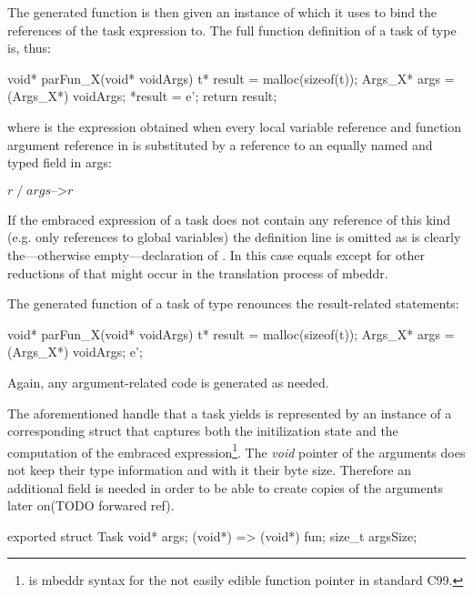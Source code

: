 The generated function  is then given an instance of  which it uses to bind the references of the task expression to. The full function definition of a task  of type  is, thus:

\begin{ccode}
void* parFun_X(void* voidArgs) {
  t* result = malloc(sizeof(t));
  Args_X* args = (Args_X*) voidArgs;
  *result = e';
  return result;
}
\end{ccode}

where  is the expression obtained when every local variable reference and function argument reference  in  is substituted by a reference to an equally named and typed field in args:

$r\;/\;args\text{-->}r$

If the embraced expression of a task does not contain any reference of this kind (e.g. only references to global variables) the  definition line is omitted as is clearly the---otherwise empty---declaration of . In this case  equals  except for other reductions of  that might occur in the translation process of mbeddr.

The generated function of a task of type  renounces the result-related statements:

\begin{ccode}
void* parFun_X(void* voidArgs) {
  t* result = malloc(sizeof(t));
  Args_X* args = (Args_X*) voidArgs;
  e';
}
\end{ccode}

Again, any argument-related code is generated as needed.

The aforementioned handle that a task yields is represented by an instance of a corresponding struct that captures both the initilization state and the computation of the embraced expression\footnote{ is mbeddr syntax for the not easily edible function pointer  in standard C99.}. The \textit{void} pointer of the arguments  does not keep their type information and with it their byte size. Therefore an additional field  is needed in order to be able to create copies of the arguments later on(TODO forwared ref).
\begin{ccode}
exported struct Task {
  void* args;
  (void*) => (void*) fun;
  size_t argsSize;
}
\end{ccode}

